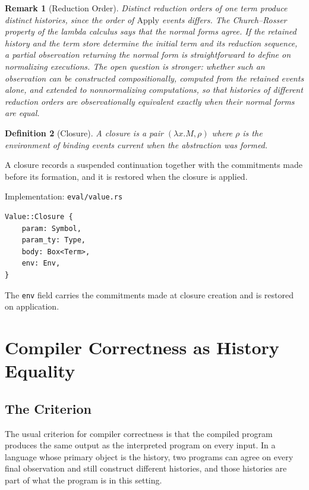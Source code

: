 \documentclass[12pt,oneside,openany]{book}
\theoremstyle{spherepop}
\newtheorem{definition}{Definition}[chapter]
\theoremstyle{remarkstyle}
\newtheorem{remark}[definition]{Remark}
\begin{document}
\begin{remark}[Reduction Order]
Distinct reduction orders of one term produce distinct histories, since the order of $\mathrm{Apply}$ events differs. The Church--Rosser property of the lambda calculus \cite{barendregt} says that the normal forms agree. If the retained history and the term store determine the initial term and its reduction sequence, a partial observation returning the normal form is straightforward to define on normalizing executions. The open question is stronger: whether such an observation can be constructed compositionally, computed from the retained events alone, and extended to nonnormalizing computations, so that histories of different reduction orders are observationally equivalent exactly when their normal forms are equal.
\end{remark}

\begin{definition}[Closure]
A \emph{closure} is a pair $(\lambda x.M,\rho)$ where $\rho$ is the environment of binding events current when the abstraction was formed.
\end{definition}

A closure records a suspended continuation together with the commitments made before its formation, and it is restored when the closure is applied.

\begin{implbox}{Implementation: \texttt{eval/value.rs}}
\begin{lstlisting}
Value::Closure {
    param: Symbol,
    param_ty: Type,
    body: Box<Term>,
    env: Env,
}
\end{lstlisting}
The \texttt{env} field carries the commitments made at closure creation and is restored on application.
\end{implbox}

\chapter{Compiler Correctness as History Equality}
\label{ch:compiler}

\section{The Criterion}

The usual criterion for compiler correctness is that the compiled program produces the same output as the interpreted program on every input. In a language whose primary object is the history, two programs can agree on every final observation and still construct different histories, and those histories are part of what the program is in this setting.
\end{document}
